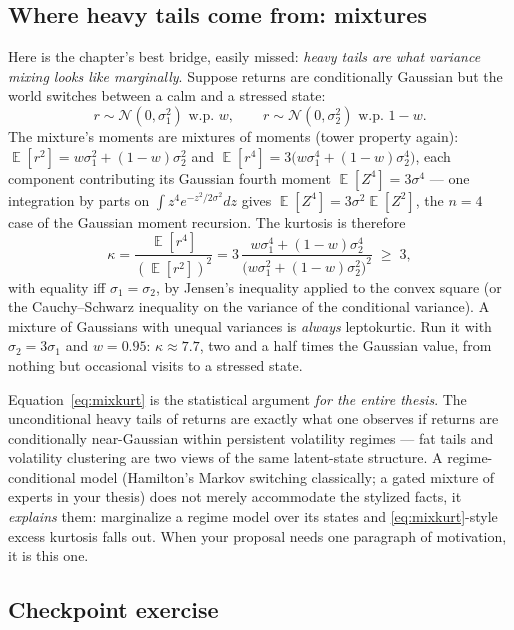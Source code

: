 \documentclass[11pt]{article}
\numberwithin{equation}{section}
\theoremstyle{plain}
\theoremstyle{definition}
\theoremstyle{remark}
\newcounter{exercise}
\DeclareMathOperator{\E}{\mathbb{E}}
\newcommand{\Normal}{\mathcal{N}}
\begin{document}
\subsection{Where heavy tails come from: mixtures}\label{sec:mixturekurtosis}

Here is the chapter's best bridge, easily missed: \emph{heavy tails are what variance mixing looks like marginally}. Suppose returns are conditionally Gaussian but the world switches between a calm and a stressed state:
\[
r \sim \Normal(0, \sigma_1^2) \text{ w.p. } w, \qquad
r \sim \Normal(0, \sigma_2^2) \text{ w.p. } 1 - w .
\]
The mixture's moments are mixtures of moments (tower property again): $\E[r^2] = w\sigma_1^2 + (1-w)\sigma_2^2$ and $\E[r^4] = 3\big(w\sigma_1^4 + (1-w)\sigma_2^4\big)$, each component contributing its Gaussian fourth moment $\E[Z^4] = 3\sigma^4$ --- one integration by parts on $\int z^4 e^{-z^2/2\sigma^2}dz$ gives $\E[Z^4] = 3\sigma^2 \E[Z^2]$, the $n=4$ case of the Gaussian moment recursion. The kurtosis is therefore
\begin{equation}
\kappa
= \frac{\E[r^4]}{(\E[r^2])^2}
= 3\,\frac{w\sigma_1^4 + (1-w)\sigma_2^4}{\big(w\sigma_1^2 + (1-w)\sigma_2^2\big)^2}
\;\ge\; 3,
\label{eq:mixkurt}
\end{equation}
with equality iff $\sigma_1 = \sigma_2$, by Jensen's inequality applied to the convex square (or the Cauchy--Schwarz inequality on the variance of the conditional variance). A mixture of Gaussians with unequal variances is \emph{always} leptokurtic. Run it with $\sigma_2 = 3\sigma_1$ and $w = 0.95$: $\kappa \approx 7.7$, two and a half times the Gaussian value, from nothing but occasional visits to a stressed state.

\begin{necbox}
Equation~\eqref{eq:mixkurt} is the statistical argument \emph{for the entire thesis}. The unconditional heavy tails of returns are exactly what one observes if returns are conditionally near-Gaussian within persistent volatility regimes --- fat tails and volatility clustering are two views of the same latent-state structure. A regime-conditional model (Hamilton's Markov switching classically; a gated mixture of experts in your thesis) does not merely accommodate the stylized facts, it \emph{explains} them: marginalize a regime model over its states and \eqref{eq:mixkurt}-style excess kurtosis falls out. When your proposal needs one paragraph of motivation, it is this one.
\end{necbox}


\subsection*{Checkpoint exercise}
\end{document}
